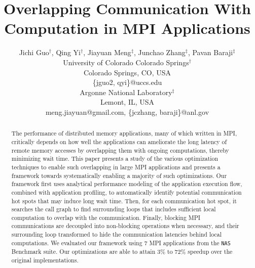 \documentclass[10pt,doublecolumn,conference]{IEEEtran}
\begin{document}
%
%
\title{Overlapping Communication With Computation in MPI Applications}

\author{Jichi Guo$^\dag$, Qing Yi$^\dag$, Jiayuan Meng$^\ddag$, Junchao Zhang$^\ddag$, Pavan Baraji$^\ddag$\\
University of Colorado Colorado Springs$^\dag$\\
Colorado Springs, CO, USA\\
\{jguo2, qyi\}@uccs.edu \\
Argonne National Laboratory$^\ddag$\\
Lemont, IL, USA\\
meng.jiayuan@gmail.com, \{jczhang, baraji\}@anl.gov
}

\maketitle

\begin{abstract}
The performance of distributed memory applications, many of which written in MPI, critically depends on how well the
applications can ameliorate the long latency of remote memory accesses by overlapping them with ongoing computations,
thereby minimizing wait time.
This paper presents a study of the various optimization techniques to enable such overlapping in large MPI applications
and presents a framework towards systematically  enabling a majority of such optimizations.
Our framework first uses analytical performance modeling of the application execution flow,
 combined with application profiling, to automatically
identify potential communication hot spots that may induce long wait time.
Then, for each communication hot spot,
it searches the call graph to find surrounding loops that includes sufficient local computation
to overlap with the communication.
Finally,  blocking MPI communications are decoupled into non-blocking operations when necessary, and their surrounding loop
transformed to hide the communication latencies behind local computations.
We evaluated our framework using 7 MPI applications from the \texttt{NAS} Benchmark suite.
Our optimizations are able to attain 3\% to 72\% speedup over the original implementations.
\end{abstract}
\end{document}
